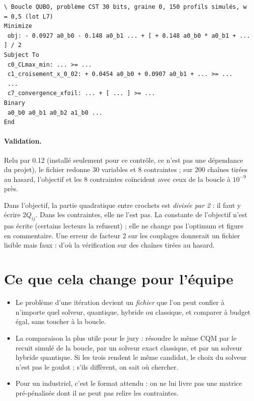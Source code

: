 \begin{codebox}
\begin{lstlisting}[language={}]
\ Boucle QUBO, problème CST 30 bits, graine 0, 150 profils simulés, w = 0,5 (lot L7)
Minimize
 obj: - 0.0927 a0_b0 - 0.148 a0_b1 ... + [ + 0.148 a0_b0 * a0_b1 + ... ] / 2
Subject To
 c0_CLmax_min: ... >= ...
 c1_croisement_x_0_02: + 0.0454 a0_b0 + 0.0907 a0_b1 + ... >= ...
 ...
 c7_convergence_xfoil: ... + [ ... ] >= ...
Binary
 a0_b0 a0_b1 a0_b2 a1_b0 ...
End
\end{lstlisting}
\end{codebox}
\paragraph{Validation.} Relu par  0.12 (installé seulement pour ce contrôle, ce n'est pas une dépendance du projet), le fichier redonne 30 variables et 8 contraintes ; sur 200 chaînes tirées au hasard, l'objectif et les 8 contraintes coïncident avec ceux de la boucle à $10^{-9}$ près.

\begin{piege}
Dans l'objectif, la partie quadratique entre crochets est \emph{divisée par 2} : il faut y écrire $2Q_{ij}$. Dans les contraintes, elle ne l'est pas. La constante de l'objectif n'est pas écrite (certains lecteurs la refusent) ; elle ne change pas l'optimum et figure en commentaire. Une erreur de facteur 2 sur les couplages donnerait un fichier lisible mais faux : d'où la vérification sur des chaînes tirées au hasard.
\end{piege}

\section{Ce que cela change pour l'équipe}
\begin{itemize}
\item Le problème d'une itération devient un \emph{fichier} que l'on peut confier à n'importe quel solveur, quantique, hybride ou classique, et comparer à budget égal, sans toucher à la boucle.
\item La comparaison la plus utile pour le jury : résoudre le même CQM par le recuit simulé de la boucle, par un solveur exact classique, et par un solveur hybride quantique. Si les trois rendent le même candidat, le choix du solveur n'est pas le goulot ; s'ils diffèrent, on sait où chercher.
\item Pour un industriel, c'est le format attendu : on ne lui livre pas une matrice pré-pénalisée dont il ne peut pas relire les contraintes.
\end{itemize}


